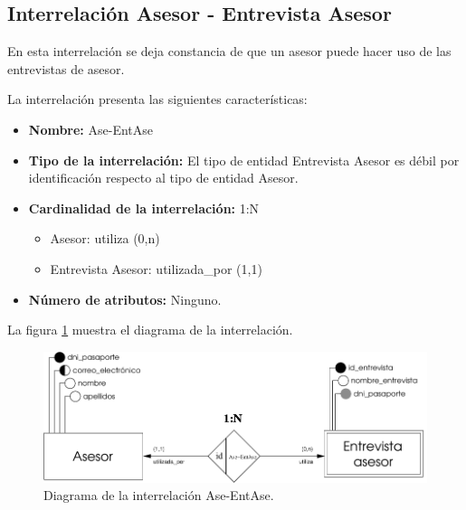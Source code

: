 \subsection{Interrelación Asesor - Entrevista Asesor}

   \begin{description}
      \item[Definición] En esta interrelación se deja constancia de que un
      asesor puede hacer uso de las entrevistas de asesor.

      \item[Características] La interrelación presenta las siguientes
                             características:

         \begin{itemize}
            \item \textbf{Nombre:} Ase-EntAse
            \item \textbf{Tipo de la interrelación:} El tipo de entidad
                  Entrevista Asesor es débil por identificación respecto al
                  tipo de entidad Asesor.
            \item \textbf{Cardinalidad de la interrelación:} 1:N
                  \begin{itemize}
                     \item Asesor: utiliza (0,n)
                     \item Entrevista Asesor: utilizada\_por (1,1)
                  \end{itemize}
            \item \textbf{Número de atributos:} Ninguno.
         \end{itemize}

      \item[Diagrama] La figura \ref{diagramaAse-EntAse} muestra el diagrama de la
                      interrelación.

      \item \begin{figure}[!ht]
            \begin{center}
            \includegraphics[]{07.Modelo_Entidad-Interrelacion/7.3.Analisis_Interrelaciones/diagramas/Ase-EntAse.pdf}
            \caption{Diagrama de la interrelación Ase-EntAse.}
            \label{diagramaAse-EntAse}
            \end{center}
         \end{figure}


\end{description}
